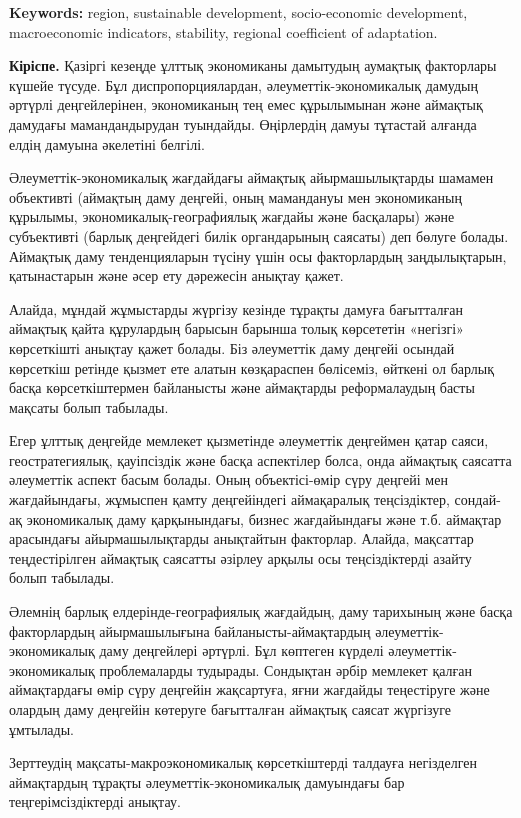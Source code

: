 {\bfseries Keywords:} region, sustainable development, socio-economic
development, macroeconomic indicators, stability, regional coefficient
of adaptation.

\begin{multicols}{2}
{\bfseries Кіріспе.} Қазіргі кезеңде ұлттық экономиканы дамытудың аумақтық
факторлары күшейе түсуде. Бұл диспропорциялардан,
әлеуметтік-экономикалық дамудың әртүрлі деңгейлерінен, экономиканың тең
емес құрылымынан және аймақтық дамудағы мамандандырудан туындайды.
Өңірлердің дамуы тұтастай алғанда елдің дамуына әкелетіні белгілі.

Әлеуметтік-экономикалық жағдайдағы аймақтық айырмашылықтарды шамамен
объективті (аймақтың даму деңгейі, оның мамандануы мен экономиканың
құрылымы, экономикалық-географиялық жағдайы және басқалары) және
субъективті (барлық деңгейдегі билік органдарының саясаты) деп бөлуге
болады. Аймақтық даму тенденцияларын түсіну үшін осы факторлардың
заңдылықтарын, қатынастарын және әсер ету дәрежесін анықтау қажет.

Алайда, мұндай жұмыстарды жүргізу кезінде тұрақты дамуға бағытталған
аймақтық қайта құрулардың барысын барынша толық көрсететін «негізгі»
көрсеткішті анықтау қажет болады. Біз әлеуметтік даму деңгейі осындай
көрсеткіш ретінде қызмет ете алатын көзқараспен бөлісеміз, өйткені ол
барлық басқа көрсеткіштермен байланысты және аймақтарды реформалаудың
басты мақсаты болып табылады.

Егер ұлттық деңгейде мемлекет қызметінде әлеуметтік деңгеймен қатар
саяси, геостратегиялық, қауіпсіздік және басқа аспектілер болса, онда
аймақтық саясатта әлеуметтік аспект басым болады. Оның объектісі-өмір
сүру деңгейі мен жағдайындағы, жұмыспен қамту деңгейіндегі аймақаралық
теңсіздіктер, сондай-ақ экономикалық даму қарқынындағы, бизнес
жағдайындағы және т.б. аймақтар арасындағы айырмашылықтарды анықтайтын
факторлар. Алайда, мақсаттар теңдестірілген аймақтық саясатты әзірлеу
арқылы осы теңсіздіктерді азайту болып табылады.

Әлемнің барлық елдерінде-географиялық жағдайдың, даму тарихының және
басқа факторлардың айырмашылығына байланысты-аймақтардың
әлеуметтік-экономикалық даму деңгейлері әртүрлі. Бұл көптеген күрделі
әлеуметтік-экономикалық проблемаларды тудырады. Сондықтан әрбір мемлекет
қалған аймақтардағы өмір сүру деңгейін жақсартуға, яғни жағдайды
теңестіруге және олардың даму деңгейін көтеруге бағытталған аймақтық
саясат жүргізуге ұмтылады.

Зерттеудің мақсаты-макроэкономикалық көрсеткіштерді талдауға негізделген
аймақтардың тұрақты әлеуметтік-экономикалық дамуындағы бар
теңгерімсіздіктерді анықтау.


\end{multicols}
